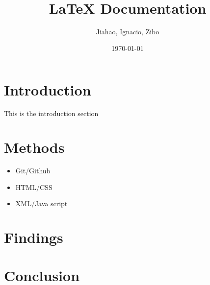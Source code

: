 \documentclass{article}
\title{LaTeX Documentation}
\author{Jiahao, Ignacio, Zibo}
\date{\today}
\begin{document}
\maketitle

\section{Introduction}

\begin{itemize}
  This is the introduction section
\end{itemize}



\section{Methods}

\begin{itemize}
  \item Git/Github 
  \item HTML/CSS
  \item XML/Java script
\end{itemize}
\section{Findings}


    
\section{Conclusion}




\end{document}
